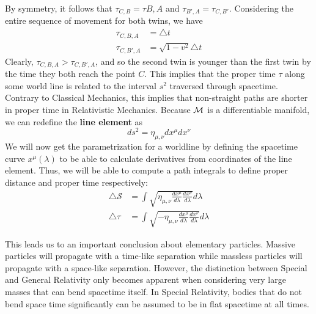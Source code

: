 \documentclass{article}
\begin{document}
		By symmetry, it follows that $\tau_{C,B} = \tau{B,A}$ and $\tau_{B', A} = \tau_{C, B'}$. Considering the entire sequence of movement for both twins, we have
		\begin{align*}
			\tau_{C,B,A} &= \triangle t \\
			\tau_{C,B',A} &= \sqrt{1 - v^2} \triangle t
 		\end{align*}
 		Clearly, $\tau_{C,B,A} > \tau_{C,B',A}$, and so the second twin is younger than the first twin by the time they both reach the point $C$. This implies that the proper time $\tau$ along some world line is related to the interval $s^2$ traversed through spacetime. Contrary to Classical Mechanics, this implies that non-straight paths are shorter in proper time in Relativistic Mechanics. Because $\mathcal{M}$ is a differentiable manifold, we can redefine the \textbf{line element} as
 		\begin{equation}
 			\label{eq:LineElement}
 			 \boxed{ds^2  = \eta_{\mu, \nu} dx^\mu dx^\nu}
 		\end{equation}
 		We will now get the parametrization for a worldline by defining the spacetime curve $x^\mu (\lambda)$ to be able to calculate derivatives from coordinates of the line element. Thus, we will be able to compute a path integrals to define proper distance and proper time respectively:
 		\begin{align*}
 			\triangle \mathcal{S} &= \int \sqrt{ \eta_{\mu, \nu} \frac{dx^\mu}{d\lambda} \frac{dx^\nu}{d\lambda}} d\lambda \\
 			\triangle \tau &= \int \sqrt{- \eta_{\mu, \nu} \frac{dx^\mu}{d\lambda} \frac{dx^\nu}{d\lambda}} d\lambda
 		\end{align*}
 		
 		This leads us to an important conclusion about elementary particles. Massive particles will propagate with a time-like separation while massless particles will propagate with a space-like separation. However, the distinction between Special and General Relativity only becomes apparent when considering very large masses that can bend spacetime itself. In Special Relativity, bodies that do not bend space time significantly can be assumed to be in flat spacetime at all times.
 		
 		
\end{document}
